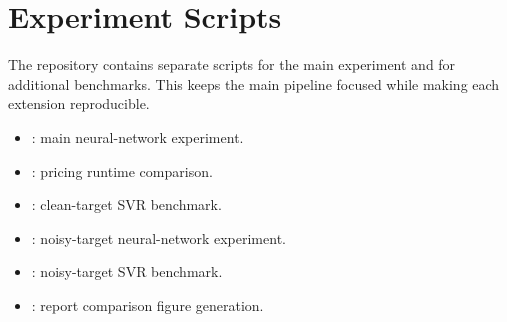 \section{Experiment Scripts}

The repository contains separate scripts for the main experiment and for additional benchmarks.
This keeps the main pipeline focused while making each extension reproducible.

\begin{itemize}
    \item \href{https://github.com/matteogiorgi/nn-option-pricing/blob/main/scripts/run_experiment.py}{}: main neural-network experiment.
    \item \href{https://github.com/matteogiorgi/nn-option-pricing/blob/main/scripts/benchmark_runtime.py}{}: pricing runtime comparison.
    \item \href{https://github.com/matteogiorgi/nn-option-pricing/blob/main/scripts/run_svr_benchmark.py}{}: clean-target SVR benchmark.
    \item \href{https://github.com/matteogiorgi/nn-option-pricing/blob/main/scripts/run_noisy_targets_experiment.py}{}: noisy-target neural-network experiment.
    \item \href{https://github.com/matteogiorgi/nn-option-pricing/blob/main/scripts/run_noisy_svr_benchmark.py}{}: noisy-target SVR benchmark.
    \item \href{https://github.com/matteogiorgi/nn-option-pricing/blob/main/scripts/generate_report_figures.py}{}: report comparison figure generation.
\end{itemize}
